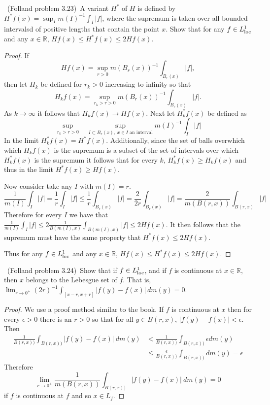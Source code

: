\documentclass[11pt]{amsart}
\theoremstyle{definition}
\numberwithin{theorem}{section}
\numberwithin{definition}{section}
\numberwithin{equation}{section}
\def\reals{{\mathbb R}}
\begin{document}
\medskip {}\ (Folland problem 3.23)\ 
A variant $H^*$ of $H$ is defined by $H^*f(x) = \sup_I m(I)^{-1}
\int_I |f|$, where the supremum is taken over all bounded intervalsd
of positive lengths that contain the point $x$.
Show that for any $f\in L^1_{\rm loc}$ and any $x\in\reals$,
$Hf(x)\le H^*f(x)\le 2Hf(x)$.
\begin{proof} If $$Hf(x) = \sup_{r > 0} m(B_r(x))^{-1} \int_{B_r(x)} |f|,$$
then let $H_k$ be defined for $r_k > 0$ increasing to infinity so that $$H_kf(x) =  \sup_{r_k>r>0} m(B_r(x))^{-1} \int_{B_r(x)} |f|.$$ As $k \to \infty$ it follows that $H_kf(x) \to Hf(x).$ Next let $H^*_kf(x)$ be defined as 
$$\sup_{r_k > r > 0} \;\;\;\sup_{I \subset B_{r}(x),\; x\in I \text{ an interval}} m(I)^{-1} \int_{I} |f|$$
In the limit $H^*_k f(x) = H^* f(x).$ Additionally, since the set of balls overwhich which $H_kf(x)$ is the supremum is a subset of the set of intervals over which $H^*_kf(x)$ is the supremum it follows that for every $k$, 
$H^*_kf(x) \geq H_kf(x)$ and thus in the limit $H^*f(x) \geq Hf(x).$ 

Now consider take any $I$ with $m(I) = r.$
\begin{equation*}
	\frac{1}{m(I)} \int_I |f| = \frac{1}{r} \int_I |f| \leq \frac{1}{r}\int_{B_{r}(x)} |f| = \frac{2}{2r}\int_{B_{r}(x)} |f| = \frac{2}{m(B(r,x))} \int_{B(r,x)} |f|
\end{equation*}
Therefore for every $I$ we have that $\frac{1}{m(I)} \int_I |f| \leq 2 \frac{1}{B(m(I), x)} \int_{B(m(I), x)} |f| \leq 2 Hf(x)$. It then follows that the supremum must have the same property that $H^*f(x) \leq 2 Hf(x).$

Thus for any $f\in L^1_{\rm loc}$ and any $x\in\reals$,
$Hf(x)\le H^*f(x)\le 2Hf(x)$.
\end{proof}

\medskip {}\ (Folland problem 3.24)\ 
Show that if $f\in L^1_{\rm loc}$, and if $f$ is continuous at $x\in\reals$,
then $x$ belongs to the Lebesgue set of $f$.
That is, $\lim_{r\to 0^+} (2r)^{-1} \int_{[x-r,x+r]}|f(y)-f(x)|\,dm(y)=0$.
\begin{proof}
	We use a proof method similar to the book. If $f$ is continuous at $x$ then for every $\epsilon > 0$
	there is an $r >0$ so that for all $y \in B(r,x)$, $|f(y) - f(x)| < \epsilon.$ 
	Then 
	\begin{equation*}
	\begin{aligned}
		\frac{1}{B(r,x))}\int_{B(r,x))} |f(y) - f(x)|\ dm(y) &< \frac{1}{B(r,x))} \int_{B(r,x))} \epsilon dm(y) \\
		&\leq 
		\frac{\epsilon}{B(r,x))} \int_{B(r,x))} dm(y) = \epsilon
	\end{aligned}
	\end{equation*}
	Therefore 
	\begin{equation*}
		\lim_{r \to 0^+} \frac{1}{m(B(r,x))} \int_{B(r,x))} |f(y) - f(x)|\ dm(y) = 0
	\end{equation*}
	if $f$ is continuous at $f$ and so $x \in L_f$.
\end{proof}
\end{document}
